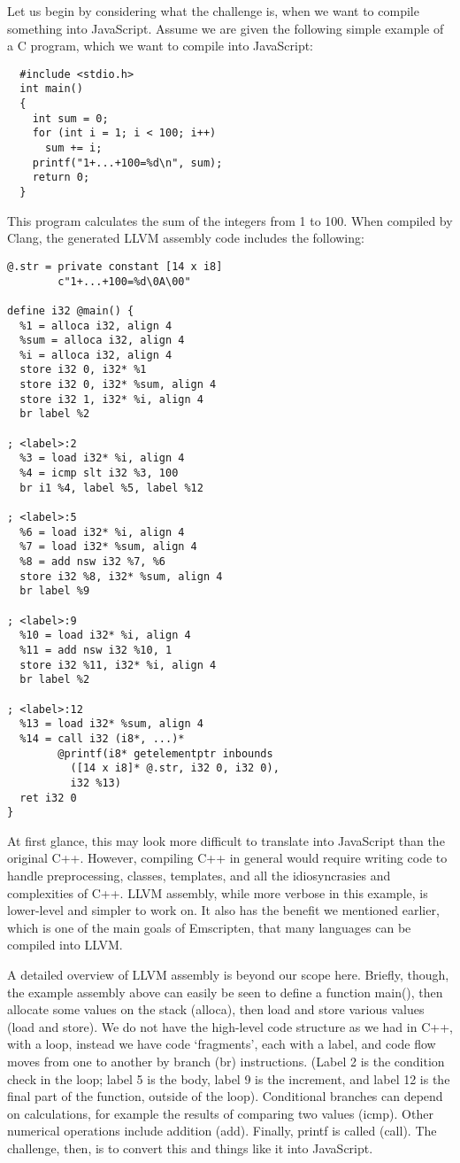 \documentclass[11pt]{proc}
\begin{document}
Let us begin by considering what the challenge is, when we want to compile something
into JavaScript. Assume we are given the
following simple example of a C program, which we want to compile into JavaScript:
\begin{verbatim}
  #include <stdio.h>
  int main()
  {
    int sum = 0;
    for (int i = 1; i < 100; i++)
      sum += i;
    printf("1+...+100=%d\n", sum);
    return 0;
  }
\end{verbatim}
This program calculates the sum of the integers from 1 to 100. When
compiled by Clang, the generated LLVM
assembly code includes the following:
\begin{verbatim}
@.str = private constant [14 x i8]
        c"1+...+100=%d\0A\00"

define i32 @main() {
  %1 = alloca i32, align 4
  %sum = alloca i32, align 4
  %i = alloca i32, align 4
  store i32 0, i32* %1
  store i32 0, i32* %sum, align 4
  store i32 1, i32* %i, align 4
  br label %2

; <label>:2
  %3 = load i32* %i, align 4
  %4 = icmp slt i32 %3, 100
  br i1 %4, label %5, label %12

; <label>:5
  %6 = load i32* %i, align 4
  %7 = load i32* %sum, align 4
  %8 = add nsw i32 %7, %6
  store i32 %8, i32* %sum, align 4
  br label %9

; <label>:9
  %10 = load i32* %i, align 4
  %11 = add nsw i32 %10, 1
  store i32 %11, i32* %i, align 4
  br label %2

; <label>:12
  %13 = load i32* %sum, align 4
  %14 = call i32 (i8*, ...)*
        @printf(i8* getelementptr inbounds
          ([14 x i8]* @.str, i32 0, i32 0),
          i32 %13)
  ret i32 0
}
\end{verbatim}
At first glance, this may look more difficult to translate into
JavaScript than the original C++. However, compiling C++ in
general would require writing code to handle preprocessing,
classes, templates, and all the idiosyncrasies and complexities
of C++. LLVM assembly, while more verbose in this example, is
lower-level and simpler to work on. It also has the benefit we
mentioned earlier, which
is one of the main goals of Emscripten, that many languages can
be compiled into LLVM.

A detailed overview of LLVM assembly is beyond our scope here. Briefly,
though, the example assembly above can easily be seen to define a
function main(), then allocate some values on the stack (alloca),
then load and store various values (load and store). We do not have
the high-level code structure as we had in C++, with a loop, instead
we have code `fragments', each with a label, and code flow moves
from one to another by branch (br) instructions. (Label 2 is the
condition check in the loop; label 5 is the body, label 9 is the
increment, and label 12 is the final part of the function, outside
of the loop).
Conditional branches
can depend on calculations, for example the results of comparing
two values (icmp). Other numerical operations include addition (add).
Finally, printf is called (call). The challenge, then, is to convert
this and things like it into JavaScript.
\end{document}
